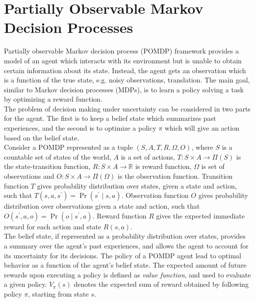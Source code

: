 \section{Partially Observable Markov Decision Processes}
\label{sec:belief_POMDP}
Partially observable Markov decision process (POMDP) framework provides a model of an agent which interacts with its environment but is unable to obtain certain information about its state. Instead, the agent gets an observation which is a function of the true state, e.g. noisy observations, translation. The main goal, similar to Markov decision processes (MDPs), is to learn a policy solving a task by optimizing a reward function. \\
The problem of decision making under uncertainty can be considered in two parts for the agent. The first is to keep a belief state which summarizes past experiences, and the second is to optimize a policy $ \pi $ which will give an action based on the belief state. \cite{KAELBLING199899,Murphy2000}\\
Consider a POMDP represented as a tuple $ (S, A, T, R, \Omega, O) $, where $ S $ is a countable set of states of the world, $ A $ is a set of actions, $ T: S \times A \rightarrow \varPi(S) $ is the state-transition function, $ R: S\times A \rightarrow \mathbb{R} $ is reward function, $ \Omega $ is set of observations and $ O:S\times A \rightarrow \varPi(\Omega)$ is the observation function. Transition function $ T $ gives probability distribution over states, given a state and action, such that $ T(s, a, s^\prime) = \operatorname{Pr}(s^\prime \mid s, a) $. Observation function $ O $ gives probability distribution over observations given a state and action, such that $ O(s^\prime, a, o) = \operatorname{Pr}(o \mid s^\prime, a) $. Reward function $ R $ gives the expected immediate reward for each action and state $ R(s,a) $.\\
The belief state, if represented as a probability distribution over states, provides a summary over the agent's past experiences, and allows the agent to account for its uncertainty for its decisions. The policy of a POMDP agent lead to optimal behavior as a function of the agent's belief state. %
The expected amount of future rewards upon executing a policy is defined as \textit{value function}, and used to evaluate a given policy. $ V_\pi(s) $ denotes the expected sum of reward obtained by following policy $ \pi $, starting from state $ s $.\\
